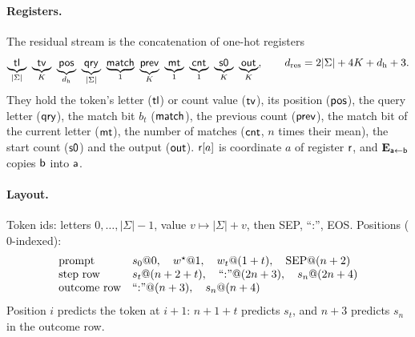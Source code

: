 \paragraph{Registers.} The residual stream is the concatenation of one-hot registers
\[
 \underbrace{\reg{tl}}_{|\Sigma|}\ \underbrace{\reg{tv}}_{K}\ \underbrace{\reg{pos}}_{d_{\mathrm h}}\ \underbrace{\reg{qry}}_{|\Sigma|}\ \underbrace{\reg{match}}_{1}\
 \underbrace{\reg{prev}}_{K}\ \underbrace{\reg{mt}}_{1}\ \underbrace{\reg{cnt}}_{1}\ \underbrace{\reg{s0}}_{K}\ \underbrace{\reg{out}}_{K},
 \qquad d_{\mathrm{res}}=2|\Sigma|+4K+d_{\mathrm h}+3 .
\]
They hold the token's letter ($\mathsf{tl}$) or count value ($\mathsf{tv}$), its position ($\mathsf{pos}$), the query letter ($\mathsf{qry}$), the match
bit $b_t$ ($\mathsf{match}$), the previous count ($\mathsf{prev}$), the match bit of the current letter ($\mathsf{mt}$), the number of matches
($\mathsf{cnt}$, $n$ times their mean), the start count ($\mathsf{s0}$) and the output ($\mathsf{out}$).
$\mathsf{r}[a]$ is coordinate $a$ of register $\mathsf{r}$, and $\mathbf E_{\mathsf{a}\leftarrow\mathsf{b}}$ copies $\mathsf{b}$ into $\mathsf{a}$.

\paragraph{Layout.} Token ids: letters $0,\ldots,|\Sigma|-1$, value $v\mapsto|\Sigma|+v$, then SEP, ``:'', EOS. Positions ($0$-indexed):
\[
\begin{array}{ll}
 \text{prompt} & s_0@0,\quad w^\star@1,\quad w_t@(1+t),\quad \mathrm{SEP}@(n+2)\\
 \text{step row} & s_t@(n+2+t),\quad ``{:}"@(2n+3),\quad s_n@(2n+4)\\
 \text{outcome row} & ``{:}"@(n+3),\quad s_n@(n+4)
\end{array}
\]
Position $i$ predicts the token at $i+1$: $n+1+t$ predicts $s_t$, and $n+3$ predicts $s_n$ in the outcome row.

